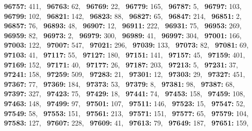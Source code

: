 \textbf{96757:} 411,\allowbreak~ 
\textbf{96763:} 62,\allowbreak~ 
\textbf{96769:} 22,\allowbreak~ 
\textbf{96779:} 165,\allowbreak~ 
\textbf{96787:} 5,\allowbreak~ 
\textbf{96797:} 103,\allowbreak~ 
\textbf{96799:} 102,\allowbreak~ 
\textbf{96821:} 142,\allowbreak~ 
\textbf{96823:} 88,\allowbreak~ 
\textbf{96827:} 65,\allowbreak~ 
\textbf{96847:} 214,\allowbreak~ 
\textbf{96851:} 2,\allowbreak~ 
\textbf{96857:} 76,\allowbreak~ 
\textbf{96893:} 48,\allowbreak~ 
\textbf{96907:} 12,\allowbreak~ 
\textbf{96911:} 222,\allowbreak~ 
\textbf{96931:} 75,\allowbreak~ 
\textbf{96953:} 269,\allowbreak~ 
\textbf{96959:} 82,\allowbreak~ 
\textbf{96973:} 2,\allowbreak~ 
\textbf{96979:} 300,\allowbreak~ 
\textbf{96989:} 41,\allowbreak~ 
\textbf{96997:} 304,\allowbreak~ 
\textbf{97001:} 166,\allowbreak~ 
\textbf{97003:} 122,\allowbreak~ 
\textbf{97007:} 547,\allowbreak~ 
\textbf{97021:} 296,\allowbreak~ 
\textbf{97039:} 133,\allowbreak~ 
\textbf{97073:} 82,\allowbreak~ 
\textbf{97081:} 69,\allowbreak~ 
\textbf{97103:} 41,\allowbreak~ 
\textbf{97117:} 55,\allowbreak~ 
\textbf{97127:} 180,\allowbreak~ 
\textbf{97151:} 141,\allowbreak~ 
\textbf{97157:} 45,\allowbreak~ 
\textbf{97159:} 401,\allowbreak~ 
\textbf{97169:} 152,\allowbreak~ 
\textbf{97171:} 40,\allowbreak~ 
\textbf{97177:} 26,\allowbreak~ 
\textbf{97187:} 203,\allowbreak~ 
\textbf{97213:} 5,\allowbreak~ 
\textbf{97231:} 37,\allowbreak~ 
\textbf{97241:} 158,\allowbreak~ 
\textbf{97259:} 509,\allowbreak~ 
\textbf{97283:} 21,\allowbreak~ 
\textbf{97301:} 12,\allowbreak~ 
\textbf{97303:} 29,\allowbreak~ 
\textbf{97327:} 451,\allowbreak~ 
\textbf{97367:} 77,\allowbreak~ 
\textbf{97369:} 184,\allowbreak~ 
\textbf{97373:} 53,\allowbreak~ 
\textbf{97379:} 8,\allowbreak~ 
\textbf{97381:} 98,\allowbreak~ 
\textbf{97387:} 68,\allowbreak~ 
\textbf{97397:} 327,\allowbreak~ 
\textbf{97423:} 75,\allowbreak~ 
\textbf{97429:} 18,\allowbreak~ 
\textbf{97441:} 74,\allowbreak~ 
\textbf{97453:} 158,\allowbreak~ 
\textbf{97459:} 108,\allowbreak~ 
\textbf{97463:} 148,\allowbreak~ 
\textbf{97499:} 97,\allowbreak~ 
\textbf{97501:} 107,\allowbreak~ 
\textbf{97511:} 146,\allowbreak~ 
\textbf{97523:} 15,\allowbreak~ 
\textbf{97547:} 52,\allowbreak~ 
\textbf{97549:} 58,\allowbreak~ 
\textbf{97553:} 151,\allowbreak~ 
\textbf{97561:} 213,\allowbreak~ 
\textbf{97571:} 151,\allowbreak~ 
\textbf{97577:} 65,\allowbreak~ 
\textbf{97579:} 104,\allowbreak~ 
\textbf{97583:} 127,\allowbreak~ 
\textbf{97607:} 228,\allowbreak~ 
\textbf{97609:} 41,\allowbreak~ 
\textbf{97613:} 79,\allowbreak~ 
\textbf{97649:} 187,\allowbreak~ 
\textbf{97651:} 159,\allowbreak~ 
